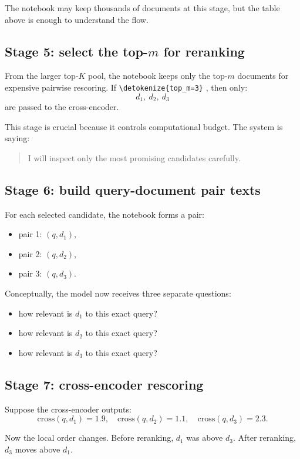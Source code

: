 \documentclass[10pt]{article}
\DeclareRobustCommand{\code}[1]{%
  \ifmmode
    \text{\nolinkurl{\detokenize{#1}}}%
  \else
    \nolinkurl{\detokenize{#1}}%
  \fi
}
\begin{document}
The notebook may keep thousands of documents at this stage, but the table above is enough to understand the flow.

\subsection*{Stage 5: select the top-\(m\) for reranking}

From the larger top-\(K\) pool, the notebook keeps only the top-\(m\) documents for expensive pairwise rescoring. If \code{top_m=3}, then only:
\[
d_1,\ d_2,\ d_3
\]
are passed to the cross-encoder.

This stage is crucial because it controls computational budget. The system is saying:
\begin{quote}
I will inspect only the most promising candidates carefully.
\end{quote}

\subsection*{Stage 6: build query-document pair texts}

For each selected candidate, the notebook forms a pair:
\begin{itemize}
    \item pair 1: \((q,d_1)\),
    \item pair 2: \((q,d_2)\),
    \item pair 3: \((q,d_3)\).
\end{itemize}

Conceptually, the model now receives three separate questions:
\begin{itemize}
    \item how relevant is \(d_1\) to this exact query?
    \item how relevant is \(d_2\) to this exact query?
    \item how relevant is \(d_3\) to this exact query?
\end{itemize}

\subsection*{Stage 7: cross-encoder rescoring}

Suppose the cross-encoder outputs:
\[
\mathrm{cross}(q,d_1)=1.9,\quad
\mathrm{cross}(q,d_2)=1.1,\quad
\mathrm{cross}(q,d_3)=2.3.
\]

Now the local order changes. Before reranking, \(d_1\) was above \(d_3\). After reranking, \(d_3\) moves above \(d_1\).
\end{document}
